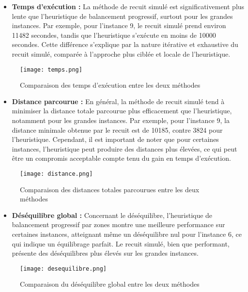 \documentclass{article}
\begin{document}
       \begin{itemize}
           \item \textbf{Temps d'exécution :} La méthode de recuit simulé est significativement plus lente que l'heuristique de balancement progressif, surtout pour les grandes instances. Par exemple, pour l'instance 9, le recuit simulé prend environ 11482 secondes, tandis que l'heuristique s'exécute en moins de 10000 secondes. Cette différence s'explique par la nature itérative et exhaustive du recuit simulé, comparée à l'approche plus ciblée et locale de l'heuristique.
\end{itemize}

\begin{figure}[htbp]
    \centering
    \texttt{[image: temps.png]}
    \caption{Comparaison des temps d'exécution entre les deux méthodes}
\end{figure}

\begin{itemize}
    \item \textbf{Distance parcourue :} En général, la méthode de recuit simulé tend à minimiser la distance totale parcourue plus efficacement que l'heuristique, notamment pour les grandes instances. Par exemple, pour l'instance 9, la distance minimale obtenue par le recuit est de 10185, contre 3824 pour l'heuristique. Cependant, il est important de noter que pour certaines instances, l'heuristique peut produire des distances plus élevées, ce qui peut être un compromis acceptable compte tenu du gain en temps d'exécution.
\end{itemize}

\begin{figure}[htbp]
    \centering
    \texttt{[image: distance.png]}
    \caption{Comparaison des distances totales parcourues entre les deux méthodes}
\end{figure}

\begin{itemize}
    \item \textbf{Déséquilibre global :} Concernant le déséquilibre, l'heuristique de balancement progressif par zones montre une meilleure performance sur certaines instances, atteignant même un déséquilibre nul pour l'instance 6, ce qui indique un équilibrage parfait. Le recuit simulé, bien que performant, présente des déséquilibres plus élevés sur les grandes instances.
\end{itemize}

\begin{figure}[!htbp]
    \centering
    \texttt{[image: desequilibre.png]}
    \caption{Comparaison du déséquilibre global entre les deux méthodes}
\end{figure}
\end{document}
